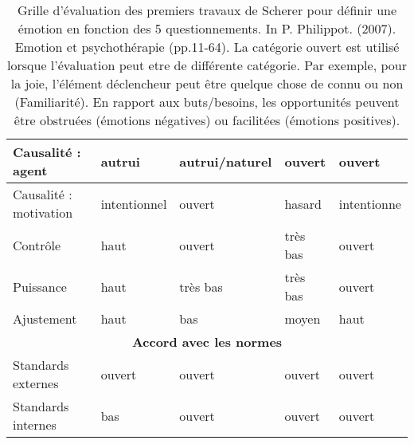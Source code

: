 \begin{table}[]
\begin{tabular}{|l|l|l|l|l|}
Causalité : agent                                     & autrui                                                     & autrui/naturel                                      & ouvert                                                   & ouvert                                              \\ \hline
Causalité : motivation                                & intentionnel                                               & ouvert                                              & hasard                                                   & intentionne                                         \\ \hline
Contrôle                                              & haut                                                       & ouvert                                              & très bas                                                 & ouvert                                              \\ \hline
Puissance                                             & haut                                                       & très bas                                            & très bas                                                 & ouvert                                              \\ \hline
Ajustement                                            & haut                                                       & bas                                                 & moyen                                                    & haut                                                \\ \hline
\multicolumn{5}{|c|}{\textbf{Accord avec les normes}}                                                                                                                                                                                                                                     \\ \hline
Standards externes                                    & ouvert                                                     & ouvert                                              & ouvert                                                   & ouvert                                              \\ \hline
Standards internes                                    & bas                                                        & ouvert                                              & ouvert                                                   & ouvert                                              \\ \hline
\end{tabular}
\label{tab:Scherer}
\caption{Grille d'évaluation des premiers travaux de Scherer pour définir une émotion en fonction des 5 questionnements. In P. Philippot. (2007). Emotion et psychothérapie (pp.11-64). La catégorie ouvert est utilisé lorsque l'évaluation peut etre de différente catégorie. Par exemple, pour la joie, l'élément déclencheur peut être quelque chose de connu ou non (Familiarité). En rapport aux buts/besoins, les opportunités peuvent être obstruées (émotions négatives) ou facilitées (émotions positives).}
\end{table}
